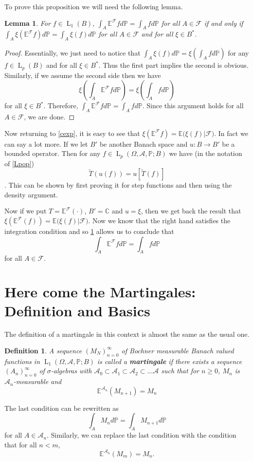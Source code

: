 \documentclass[]{report}
\newcommand{\lp}[2]{\operatorname{L}_{#1}({#2})}
\newcommand*{\ext}[1]{\mathbb{E}\big({#1}\big)}
\newcommand{\pspc}{\Omega,\mathcal{A},\mathbb{P}}
\newcommand*{\extop}[1]{\mathbb{E}^{{#1}}}
\newtheorem{lemma}[theorem]{Lemma}
\newtheorem{Def}[theorem]{Definition}
\begin{document}
To prove this proposition we will need the following lemma.
\begin{lemma}\label{scalarization}
	For $f \in \lp{1}{B}$, $ \int_A \extop{\mathcal F}fd\mathbb{P}= \int_A f d\mathbb{P} $ for all $A \in \mathcal{F}$ if and only if $ \int_A \xi(\extop{\mathcal F}f)d\mathbb{P}= \int_A \xi(f) d\mathbb{P} $ for all $A \in \mathcal{F}$ and for all $\xi \in B^*$.
\end{lemma}
\begin{proof}
	Essentially, we just need to notice that $\int_A\xi(f)d\mathbb{P} = \xi(\int_A fd\mathbb{P})$ for any $f\in\lp{p}{B}$ and for all $\xi\in B^*$. Thus the first part implies the second is obvious. Similarly, if we assume the second side then we have 
	\[ \xi\left(\int_A\extop{\mathcal F}fd\mathbb{P}\right)=\xi\left(\int_Afd\mathbb{P}\right) \]
	for all $\xi\in B^*$. Therefore, $\int_A\extop{\mathcal F}f d\mathbb{P}=\int_Afd\mathbb{P}$. Since this argument holds for all $A\in\mathcal{F}$, we are done.
\end{proof}

Now returning to \ref{cexp}, it is easy to see that $\xi(\extop{\mathcal F}f)=\ext{\xi(f)|\mathcal{F}}$. In fact we can say a lot more. If we let $B'$ be another Banach space and $u : B \rightarrow B'$ be a bounded operator. Then for any $f \in \lp{p}{\pspc;B}$  we have (in the notation of \ref{Lpop})
\[ \tilde{T}(u(f))= u[\tilde{T}(f)] \]. This can be shown by first proving it for step functions and then using the density argument. 

Now if we put $T=\extop{\mathcal F}(\cdot)$, $B'=\mathbb{C}$ and $u=\xi$, then we get back the result that $\xi(\extop{\mathcal F}(f))=\ext{\xi(f)|\mathcal{F}}$. Now we know that the right hand satisfies the integration condition and so \ref{scalarization} allows us to conclude that \[ \int_A \extop{\mathcal F}fd\mathbb{P}= \int_A f d\mathbb{P} \] for all $A \in \mathcal{F}$.

\section{Here come the Martingales: Definition and Basics}
The definition of a martingale in this context is almost the same as the usual one.
\begin{Def}
	A sequence $(M_N)_{n=0}^{\infty}$ of Bochner measurable Banach valued functions in $\lp{1}{\pspc;B}$ is called a \textbf{martingale} if there exists a sequence $(A_n)_{n=0}^{\infty}$ of $\sigma$-algebras with $\mathcal A_0 \subset \mathcal A_1 \subset \mathcal A_2 \subset \ldots \mathcal{A}$ such that for $n\geq 0$, $M_n$ is $\mathcal{A}_n$-measurable and \[ \mathbb{E}^{\mathcal A_n}(M_{n+1})=M_n \] 
\end{Def}
The last condition can be rewritten as \[ \int_A M_n d\mathbb{P}= \int_A M_{n+1} d\mathbb{P} \] for all $A \in \mathcal{A}_n$. Similarly, we can replace the last condition with the condition that for all $n<m$, \[ \mathbb{E}^{\mathcal A_n}(M_{m})=M_n. \] 
\end{document}
